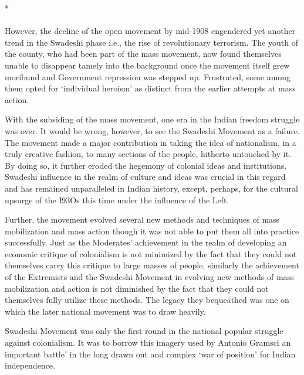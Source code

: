 \begin{center}*\end{center}

\paragraph*{}

However, the decline of the open movement by mid-1908 engendered yet another trend in the Swadeshi phase i.e., the rise of revolutionary terrorism. The youth of the county, who had been part of the mass movement, now found themselves unable to disappear tamely into the background once the movement itself grew moribund and Government repression was stepped up. Frustrated, some among them opted for `individual heroism' as distinct from the earlier attempts at mass action.

With the subsiding of the mass movement, one era in the Indian freedom struggle was over. It would be wrong, however, to see the Swadeshi Movement as a failure. The movement made a major contribution in taking the idea of nationalism, in a truly creative fashion, to many sections of the people, hitherto untouched by it. By doing so, it further eroded the hegemony of colonial ideas and institutions. Swadeshi influence in the realm of culture and ideas was crucial in this regard and has remained unparalleled in Indian history, except, perhaps, for the cultural upsurge of the I93Os this time under the influence of the Left.

Further, the movement evolved several new methods and techniques of mass mobilization and mass action though it was not able to put them all into practice successfully. Just as the Moderates' achievement in the realm of developing an economic critique of colonialism is not minimized by the fact that they could not themselves carry this critique to large masses of people, similarly the achievement of the Extremists and the Swadeshi Movement in evolving new methods of mass mobilization and action is not diminished by the fact that they could not themselves fully utilize these methods. The legacy they bequeathed was one on which the later national movement was to draw heavily.

Swadeshi Movement was only the first round in the national popular struggle against colonialism. It was to borrow this imagery used by Antonio Gramsci an important battle' in the long drawn out and complex `war of position' for Indian independence.
